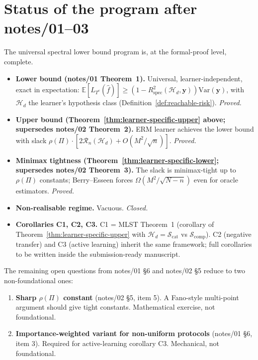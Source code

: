\documentclass[11pt,a4paper]{article}
\theoremstyle{plain}
\theoremstyle{definition}
\theoremstyle{remark}
\newcommand{\by}{\mathbf{y}}
\newcommand{\E}{\mathbb{E}}
\newcommand{\Var}{\mathrm{Var}}
\newcommand{\Rspec}{R^2_{\mathrm{spec}}}
\newcommand{\Scal}{\mathcal{S}}
\newcommand{\Hcal}{\mathcal{H}}
\begin{document}
\section{Status of the program after notes/01–03}
\label{sec:status}

The universal spectral lower bound program is, at the formal-proof level,
complete.

\begin{itemize}[label=$\bullet$, leftmargin=*]
\item \textbf{Lower bound (notes/01 Theorem~1).}  Universal,
    learner-independent, exact in expectation: $\E[L_{T^c}(\hat f)] \geq
    (1 - \Rspec(\Hcal_d, \by)) \Var(\by)$, with $\Hcal_d$ the learner's
    hypothesis class (Definition~\ref{def:reachable-risk}).  \emph{Proved.}

\item \textbf{Upper bound (Theorem~\ref{thm:learner-specific-upper}
    above; supersedes notes/02 Theorem~2).}  ERM learner achieves the
    lower bound with slack $\rho(\Pi) \cdot [2\mathcal{R}_n(\Hcal_d) +
    O(M^2/\sqrt{n})]$.  \emph{Proved.}

\item \textbf{Minimax tightness
    (Theorem~\ref{thm:learner-specific-lower}; supersedes notes/02
    Theorem~3).}  The slack is minimax-tight up to $\rho(\Pi)$
    constants; Berry--Esseen forces $\Omega(M^2/\sqrt{N-n})$ even for
    oracle estimators.  \emph{Proved.}

\item \textbf{Non-realisable regime.}  Vacuous.  \emph{Closed.}

\item \textbf{Corollaries C1, C2, C3.}  C1 = MLST Theorem~1 (corollary of
    Theorem~\ref{thm:learner-specific-upper} with $\Hcal_d = \Scal_{\mathrm{cat}}$
    vs $\Scal_{\mathrm{comp}}$).  C2 (negative transfer) and C3 (active
    learning) inherit the same framework; full corollaries to be written
    inside the submission-ready manuscript.
\end{itemize}

The remaining open questions from notes/01 §6 and notes/02 §5 reduce to
two non-foundational ones:
\begin{enumerate}
\item \textbf{Sharp $\rho(\Pi)$ constant} (notes/02 §5, item 5).  A
    Fano-style multi-point argument should give tight constants.
    Mathematical exercise, not foundational.
\item \textbf{Importance-weighted variant for non-uniform protocols}
    (notes/01 §6, item 3).  Required for active-learning corollary C3.
    Mechanical, not foundational.
\end{enumerate}
\end{document}
